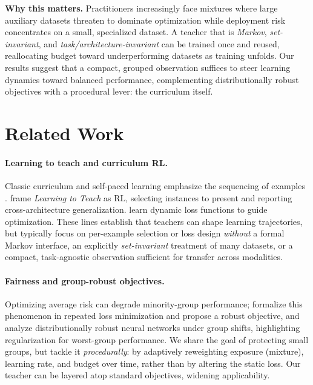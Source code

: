 \documentclass[11pt]{article}
\newcommand{\1}{\mathbf{1}}
\begin{document}
\textbf{Why this matters.} Practitioners increasingly face mixtures where large auxiliary datasets threaten to dominate optimization while deployment risk concentrates on a small, specialized dataset. A teacher that is \emph{Markov}, \emph{set-invariant}, and \emph{task/architecture-invariant} can be trained once and reused, reallocating budget toward underperforming datasets as training unfolds. Our results suggest that a compact, grouped observation suffices to steer learning dynamics toward balanced performance, complementing distributionally robust objectives with a procedural lever: the curriculum itself.

\section{Related Work}
\paragraph{Learning to teach and curriculum RL.}
Classic curriculum and self-paced learning emphasize the sequencing of examples \citep{bengio2009curriculum,kumar2010selfpaced}. \citet{fan2018l2t} frame \emph{Learning to Teach} as RL, selecting instances to present and reporting cross-architecture generalization. \citet{wu2018l2tloss} learn dynamic loss functions to guide optimization. These lines establish that teachers can shape learning trajectories, but typically focus on per-example selection or loss design \emph{without} a formal Markov interface, an explicitly \emph{set-invariant} treatment of many datasets, or a compact, task-agnostic observation sufficient for transfer across modalities.

\paragraph{Fairness and group-robust objectives.}
Optimizing average risk can degrade minority-group performance; \citet{hashimoto2018fairness} formalize this phenomenon in repeated loss minimization and propose a robust objective, and \citet{sagawa2020dro} analyze distributionally robust neural networks under group shifts, highlighting regularization for worst-group performance. We share the goal of protecting small groups, but tackle it \emph{procedurally}: by adaptively reweighting exposure (mixture), learning rate, and budget over time, rather than by altering the static loss. Our teacher can be layered atop standard objectives, widening applicability.
\end{document}
